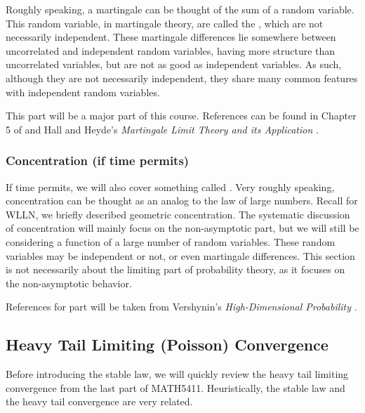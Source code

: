 \documentclass[../main/main.tex]{subfiles}
\begin{document}
Roughly speaking, a martingale can be thought of the sum of a random variable. This random variable, in martingale theory, are called the , which are not necessarily independent. These martingale differences lie somewhere between uncorrelated and independent random variables, having more structure than uncorrelated variables, but are not as good as independent variables. As such, although they are not necessarily independent, they share many common features with independent random variables.\\

\begin{remark}
	This part will be a major part of this course. References can be found in Chapter 5 of \cite{Durrett19} and Hall and Heyde's \textit{Martingale Limit Theory and its Application} \cite{Hall80}.
\end{remark}


\subsubsection{Concentration (if time permits)}

If time permits, we will also cover something called . Very roughly speaking, concentration can be thought as an analog to the law of large numbers. Recall for WLLN, we briefly described geometric concentration. The systematic discussion of concentration will mainly focus on the non-asymptotic part, but we will still be considering a function of a large number of random variables. These random variables may be independent or not, or even martingale differences. This section is not necessarily about the limiting part of probability theory, as it focuses on the non-asymptotic behavior.

\begin{remark}
	References for part will be taken from Vershynin's \textit{High-Dimensional Probability} \cite{Ver19}.
\end{remark}


\subsection{Heavy Tail Limiting (Poisson) Convergence}

Before introducing the stable law, we will quickly review the heavy tail limiting convergence from the last part of MATH5411. Heuristically, the stable law and the heavy tail convergence are very related.
\end{document}
